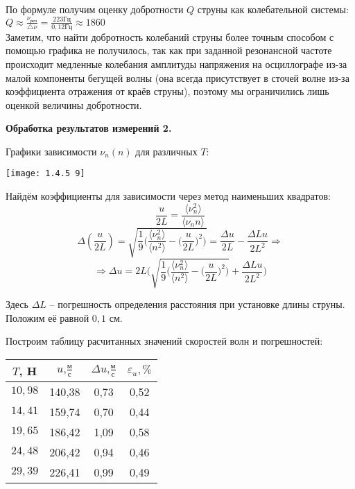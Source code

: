 \documentclass[a4paper,12pt]{article} %
\begin{document}
По формуле получим оценку добротности $Q$ струны как колебательной системы: $Q \approx \frac{\nu_{\textbf{рез}}}{\bigtriangleup \nu} = \frac{223 \text{Гц}}{0,12 \text{Гц}} \approx 1860$\\

Заметим, что найти добротность колебаний струны более точным способом с помощью графика не получилось, так как при заданной резонансной частоте происходит медленные колебания амплитуды напряжения на осциллографе из-за малой компоненты бегущей волны (она всегда присутствует в сточей волне из-за коэффициента отражения от краёв струны), поэтому мы ограничились лишь оценкой величины добротности.

\newpage

{\bf Обработка результатов измерений 2.}

Графики зависимости $\nu_n(n)$ для различных $T$:

\begin{center}
\texttt{[image: 1.4.5 9]}
\end{center}

Найдём коэффициенты для зависимости через метод наименьших квадратов:
\[\frac{u}{2L} = \frac{\langle \nu^2_n \rangle}{\langle \nu_n n \rangle}\]
\[\Delta(\frac{u}{2L}) = \sqrt{\frac{1}{9}\Big( \frac{\langle \nu^2_n \rangle}{\langle n^2 \rangle} - \Big(\frac{u}{2L}\Big)^2\Big)} = \frac{\Delta u}{2L} - \frac{\Delta L u}{2L^2} \Rightarrow\]
\[\Rightarrow \Delta u = 2L 
\Big( \sqrt{\frac{1}{9}\Big( \frac{\langle \nu^2_n \rangle}{\langle n^2 \rangle} - \Big(\frac{u}{2L}\Big)^2\Big)} + \frac{\Delta L u}{2L^2}\Big)\]

Здесь $\Delta L$ -- погрешность определения расстояния при установке длины струны. Положим её равной $0,1$ см.
 
Построим таблицу расчитанных значений скоростей волн и погрешностей:
\begin{center}

\begin{tabular}{|c|c|c|c|}
\hline 
$T$, H & $u\textbf{,} \frac{\textbf{м}}{\textbf{с}}$ & $\Delta u\textbf{,} \frac{\textbf{м}}{\textbf{с}}$ & $\varepsilon_{u}, \% $ \\ 
\hline 
$10,98$ & 140,38 & 0,73 & 0,52 \\ 
\hline 
$14,41$ & 159,74 & 0,70 & 0,44 \\ 
\hline 
$19,65$ & 186,42 & 1,09 & 0,58 \\ 
\hline 
$24,48$ & 206,42 & 0,94 & 0,46 \\ 
\hline 
$29,39$ & 226,41 & 0,99 & 0,49 \\ 
\hline 
\end{tabular}
\end{center} 
\[ \]
\end{document}
